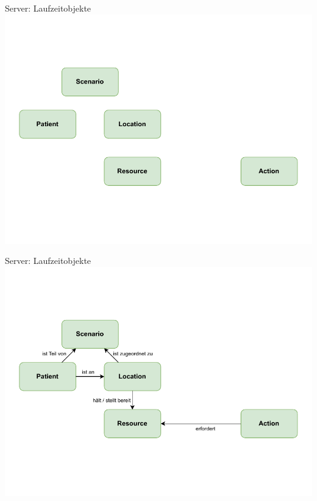 \begin{frame}{Server: Laufzeitobjekte}
	\centering
	\includegraphics[height=.9\textheight]{images/server/laufzeit_objekte_1.pdf}
\end{frame}

\begin{frame}[noframenumbering]{Server: Laufzeitobjekte}
	\centering
	\includegraphics[height=.9\textheight]{images/server/laufzeit_objekte_2.pdf}
\end{frame}

